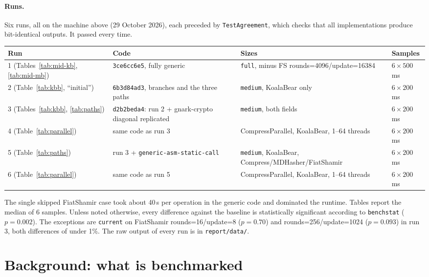 \documentclass[10pt,a4paper]{article}
\begin{document}
\paragraph{Runs.} Six runs, all on the machine above (29 October 2026), each preceded by \texttt{TestAgreement}, which checks that all
implementations produce bit-identical outputs. It passed every time.
\begin{center}\small
\begin{adjustbox}{max width=\linewidth}
\begin{tabular}{llll}
\toprule
Run & Code & Sizes & Samples \\ \midrule
1 (Tables~\ref{tab:mid-kb}, \ref{tab:mid-mb}) & \texttt{3ce6cc6e5}, fully generic & \texttt{full}, minus FS rounds=4096/update=16384 & $6\times500$\,ms \\
2 (Table~\ref{tab:kbb}, ``initial'') & \texttt{6b3d84ad3}, branches and the three paths & \texttt{medium}, KoalaBear only & $6\times200$\,ms \\
3 (Tables~\ref{tab:kbb}, \ref{tab:paths}) & \texttt{d2b2beda4}: run 2 + gnark-crypto diagonal replicated & \texttt{medium}, both fields & $6\times200$\,ms \\
4 (Table~\ref{tab:parallel}) & same code as run 3 & CompressParallel, KoalaBear, 1--64 threads & $6\times200$\,ms \\
5 (Table~\ref{tab:paths}) & run 3 + \texttt{generic-asm-static-call} & \texttt{medium}, KoalaBear, Compress/MDHasher/FiatShamir & $6\times200$\,ms \\
6 (Table~\ref{tab:parallel}) & same code as run 5 & CompressParallel, KoalaBear, 1--64 threads & $6\times200$\,ms \\
\bottomrule
\end{tabular}
\end{adjustbox}
\end{center}
The single skipped FiatShamir case took about 40\,s per operation in the generic code and
dominated the runtime. Tables report the median of 6 samples. Unless noted otherwise, every
difference against the baseline is statistically significant according to \texttt{benchstat}
($p = 0.002$). The exceptions are \texttt{current} on FiatShamir rounds=16/update=8
($p=0.70$) and rounds=256/update=1024 ($p=0.093$) in run 3, both differences of under 1\%.
The raw output of every run is in \texttt{report/data/}.

\section{Background: what is benchmarked}
\end{document}
